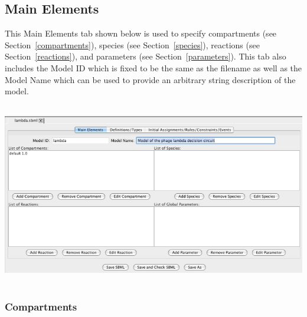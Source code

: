 \documentclass[titlepage,11pt]{article}
\begin{document}
\subsection{\label{MainElem}Main Elements}

\noindent
This Main Elements tab shown below is used to specify 
compartments (see Section~\ref{compartments}), 
species (see Section~\ref{species}), 
reactions (see Section~\ref{reactions}), and
parameters (see Section~\ref{parameters}).
This tab also includes the Model ID which is fixed to be the same as
the filename as well as the Model Name which can be used to provide an
arbitrary string description of the model.
\begin{center}
\includegraphics[height=80mm]{screenshots/mainElem}
\end{center}

\subsubsection{\label{compartments}Compartments}
\end{document}
